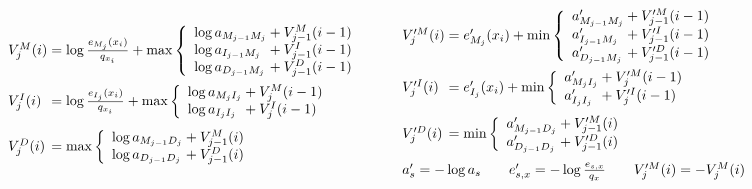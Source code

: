 \documentclass[preprint,nonatbib,blockstyle,nocopyrightspace,times]{sigplanconf}
\begin{document}
\begin{figure}
\newcommand\vsum[2]{#2&{}+{}& #1}

\def\goo{18pt}
\def\gum{14pt}
\[
\begin{array}{l@{}c@{}l}
V_{j}^{M}(i) &{}={}& \log\frac{e_{M_{j}}(x_{i})}{q_{x_{i}}} + \max \left\{
\begin{array}{l@{}c@{}l}
\vsum{V_{j-1}^{M}(i - 1)} {\log a_{M_{j-1}M_{j}}}\\
\vsum{V_{j-1}^{I}(i - 1)} {\log a_{I_{j-1}M_{j}}}\\
\vsum{V_{j-1}^{D}(i - 1)} {\log a_{D_{j-1}M_{j}}}\\
\end{array} \right.\\[\goo]
V_{j}^{I}(i) &=& \log\frac{e_{I_{j}}(x_{i})}{q_{x_{i}}} + \max \left\{
\begin{array}{l@{}c@{}l}
\vsum{V_{j}^{M}(i - 1)} {\log a_{M_{j}I_{j}}}\\
\vsum{V_{j}^{I}(i - 1)} {\log a_{I_{j}I_{j}}}\\
\end{array} \right.\\[\gum]
V_{j}^{D}(i) &=& \max \left\{
\begin{array}{l@{}c@{}l}
\vsum{V_{j-1}^{M}(i)} {\log a_{M_{j-1}D_{j}}}\\
\vsum{V_{j-1}^{D}(i)} {\log a_{D_{j-1}D_{j}}}\\
\end{array} \right.\\
\end{array}
\qquad
\begin{array}{l@{}c@{}l}
V_{j}^{\prime M}(i) &{}={}& e^{\prime}_{M_{j}}(x_{i}) + \min \left\{
\begin{array}{l@{}c@{}l}
\vsum{V_{j-1}^{\prime M}(i - 1)} {a^{\prime}_{M_{j-1}M_{j}}}\\
\vsum{V_{j-1}^{\prime I}(i - 1)} {a^{\prime}_{I_{j-1}M_{j}}}\\
\vsum{V_{j-1}^{\prime D}(i - 1)} {a^{\prime}_{D_{j-1}M_{j}}}\\
\end{array} \right.\\[\goo]
V_{j}^{\prime I}(i) &=& e^{\prime}_{I_{j}}(x_{i}) + \min \left\{
\begin{array}{l@{}c@{}l}
\vsum{V_{j}^{\prime M}(i - 1)} {a^{\prime}_{M_{j}I_{j}}}\\
\vsum{V_{j}^{\prime I}(i - 1)} {a^{\prime}_{I_{j}I_{j}}}\\
\end{array} \right.\\[\gum]
V_{j}^{\prime D}(i) &=& \min \left\{
\begin{array}{l@{}c@{}l}
\vsum{V_{j-1}^{\prime M}(i)} {a^{\prime}_{M_{j-1}D_{j}}}\\
\vsum{V_{j-1}^{\prime D}(i)} {a^{\prime}_{D_{j-1}D_{j}}}\\
\end{array} \right.\\[\gum]
\multicolumn3{l}{%
a'_{s} = - \log a_{s} 
\qquad
e^{\prime}_{s,x} = - \log\frac{e_{s,x}}{q_{x}}
\qquad
V_j^{\prime M}(i) = - V_j^{M}(i)
}
\\
\end{array}
\]


\end{figure}
\end{document}
